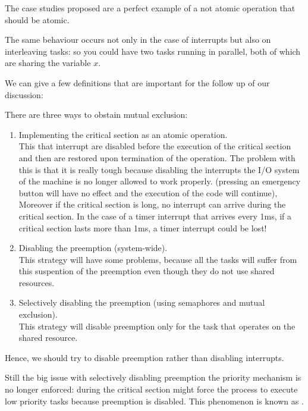 The case studies proposed are a perfect example of a not atomic operation that should be atomic.

The same behaviour occurs not only in the case of interrupts but also on interleaving tasks: so you could have two tasks running in parallel, both of which are sharing the variable $x$.

We can give a few definitions that are important for the follow up of our discussion:

There are three ways to obstain mutual exclusion:
\begin{enumerate}
    \item Implementing the critical section as an atomic operation.\\
    This that interrupt are disabled before the execution of the critical section and then are restored upon termination of the operation. The problem with this is that it is really tough because disabling the interrupts the I/O system of the machine is no longer allowed to work properly. (pressing an emergency button will have no effect and the execution of the code will continue),\\
    Moreover if the critical section is long, no interrupt can arrive during the critical section. In the case of a timer interrupt that arrives every 1ms, if a critical section lasts more than 1ms, a timer interrupt could be lost!
    \item Disabling the preemption (system-wide).\\
    This strategy will have some problems, because all the tasks will suffer from this suspention of the preemption even though they do not use shared resources.
    \item Selectively disabling the preemption (using semaphores and mutual exclusion).\\
    This strategy will disable preemption only for the task that operates on the shared resource.
\end{enumerate}
Hence, we should try to disable preemption rather than disabling interrupts.

Still the big issue with selectively disabling preemption the priority mechanism is no longer enforced: during the critical section might force the process to execute low priority tasks because preemption is disabled. This phenomenon is known as .

